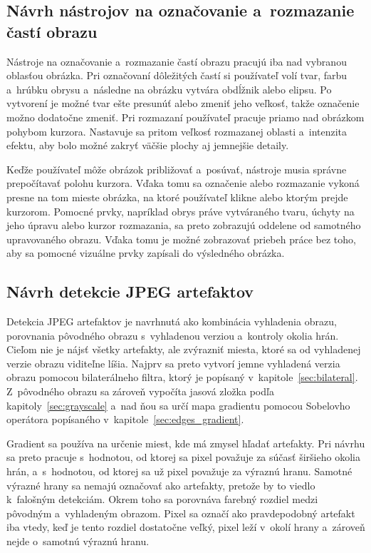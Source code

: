 \subsection{Návrh nástrojov na označovanie a~rozmazanie častí obrazu}

Nástroje na označovanie a~rozmazanie častí obrazu pracujú iba nad vybranou oblasťou obrázka. Pri označovaní dôležitých častí si používateľ volí tvar, farbu a~hrúbku obrysu a~následne na obrázku vytvára obdĺžnik alebo elipsu. Po vytvorení je možné tvar ešte presunúť alebo zmeniť jeho veľkosť, takže označenie možno dodatočne zmeniť. Pri rozmazaní používateľ pracuje priamo nad obrázkom pohybom kurzora. Nastavuje sa pritom veľkosť rozmazanej oblasti a~intenzita efektu, aby bolo možné zakryť väčšie plochy aj jemnejšie detaily.

Keďže používateľ môže obrázok približovať a~posúvať, nástroje musia správne prepočítavať polohu kurzora. Vďaka tomu sa označenie alebo rozmazanie vykoná presne na tom mieste obrázka, na ktoré používateľ klikne alebo ktorým prejde kurzorom. Pomocné prvky, napríklad obrys práve vytváraného tvaru, úchyty na jeho úpravu alebo kurzor rozmazania, sa preto zobrazujú oddelene od samotného upravovaného obrazu. Vďaka tomu je možné zobrazovať priebeh práce bez toho, aby sa pomocné vizuálne prvky zapísali do výsledného obrázka.

\subsection{Návrh detekcie JPEG artefaktov}

Detekcia JPEG artefaktov je navrhnutá ako kombinácia vyhladenia obrazu, porovnania pôvodného obrazu s~vyhladenou verziou a~kontroly okolia hrán. Cieľom nie je nájsť všetky artefakty, ale zvýrazniť miesta, ktoré sa od vyhladenej verzie obrazu viditeľne líšia. Najprv sa preto vytvorí jemne vyhladená verzia obrazu pomocou bilaterálneho filtra, ktorý je popísaný v~kapitole~\ref{sec:bilateral}. Z~pôvodného obrazu sa zároveň vypočíta jasová zložka podľa kapitoly~\ref{sec:grayscale} a~nad ňou sa určí mapa gradientu pomocou Sobelovho operátora popísaného v~kapitole~\ref{sec:edges_gradient}.

Gradient sa používa na určenie miest, kde má zmysel hľadať artefakty. Pri návrhu sa preto pracuje s~hodnotou, od ktorej sa pixel považuje za súčasť širšieho okolia hrán, a~s~hodnotou, od ktorej sa už pixel považuje za výraznú hranu. Samotné výrazné hrany sa nemajú označovať ako artefakty, pretože by to viedlo k~falošným detekciám. Okrem toho sa porovnáva farebný rozdiel medzi pôvodným a~vyhladeným obrazom. Pixel sa označí ako pravdepodobný artefakt iba vtedy, keď je tento rozdiel dostatočne veľký, pixel leží v~okolí hrany a~zároveň nejde o~samotnú výraznú hranu.

